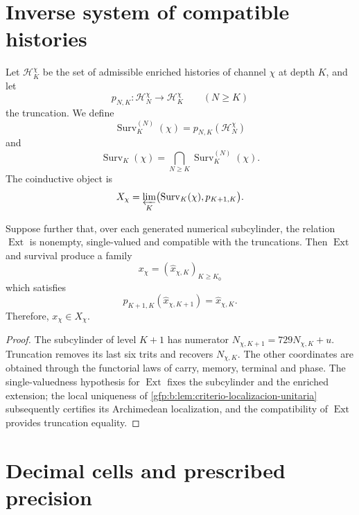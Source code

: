 \section{Inverse system of compatible histories}

Let \(\mathcal H_K^\chi\) be the set of admissible enriched histories
of channel \(\chi\) at depth \(K\), and let
\[
 p_{N,K}:\mathcal H_N^\chi\longrightarrow\mathcal H_K^\chi
 \qquad(N\geq K)
\]
the truncation. We define
\[
 \operatorname{Surv}_K^{(N)}(\chi)
 =p_{N,K}(\mathcal H_N^\chi)
\]
and
\begin{equation}
 \operatorname{Surv}_K(\chi)
 =\bigcap_{N\geq K}\operatorname{Surv}_K^{(N)}(\chi).
 \label{gfp:b:eq:supervivencia-todas-profundidades}
\end{equation}
The coinductive object is
\begin{equation}
 X_\chi=
 \varprojlim_K
 \bigl(\operatorname{Surv}_K(\chi),p_{K+1,K}\bigr).
 \label{gfp:b:eq:limite-inverso-caracteres}
\end{equation}

\begin{theorem}
\label{gfp:b:thm:seccion-compatible-caracteres}
Suppose further that, over each generated numerical subcylinder, the
relation \(\operatorname{Ext}\) is nonempty, single-valued and compatible with the
truncations. Then \(\operatorname{Ext}\) and survival produce a family
\[
 x_\chi=(\widehat x_{\chi,K})_{K\geq K_0}
\]
which satisfies
\[
 p_{K+1,K}(\widehat x_{\chi,K+1})
 =\widehat x_{\chi,K}.
\]
Therefore, \(x_\chi\in X_\chi\).
\end{theorem}

\begin{proof}
The subcylinder of level \(K+1\) has numerator
\(N_{\chi,K+1}=729N_{\chi,K}+u\). Truncation removes its last six
trits and recovers \(N_{\chi,K}\). The other coordinates are obtained through the
functorial laws of carry, memory, terminal and phase. The single-valuedness
hypothesis for \(\operatorname{Ext}\) fixes the subcylinder and the enriched
extension; the local uniqueness of
\cref{gfp:b:lem:criterio-localizacion-unitaria} subsequently certifies its
Archimedean localization, and the compatibility of \(\operatorname{Ext}\)
provides truncation equality.
\end{proof}

\section{Decimal cells and prescribed precision}

